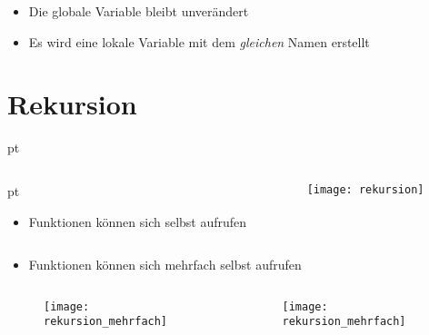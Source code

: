 \begin{frame}
	\slidehead
	\begin{itemize}
		\item Die globale Variable  bleibt unverändert
		\item Es wird eine lokale Variable mit dem \textit{gleichen} Namen erstellt
	\end{itemize}
\end{frame}

\livecoding

\section{Rekursion}
\begin{frame}[t]
	\slidehead

	 pt
	\begin{columns}
		\begin{column}{4.5cm}
			 pt
			\begin{itemize}
				\item Funktionen können sich selbst aufrufen
			\end{itemize}
		\end{column}

		\begin{column}{7cm}
			\begin{figure}
				\texttt{[image: rekursion]}
			\end{figure}
		\end{column}
	\end{columns}
\end{frame}

\begin{frame}[t]
	\slidehead

	\begin{itemize}
		\item Funktionen können sich mehrfach selbst aufrufen
	\end{itemize}

	\begin{columns}
		\begin{column}{5cm}
			\begin{figure}
				\texttt{[image: rekursion\_mehrfach]}

			\end{figure}
		\end{column}

		\begin{column}{5cm}
			\begin{figure}
				\texttt{[image: rekursion\_mehrfach]}

			\end{figure}
		\end{column}
	\end{columns}
\end{frame}

